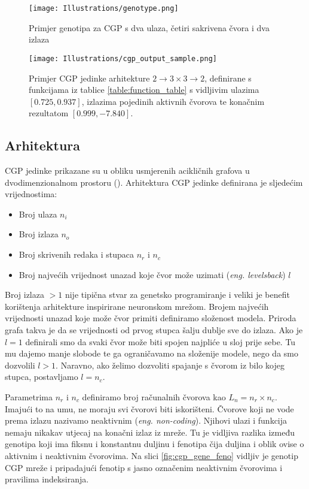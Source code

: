 \begin{figure}
	\centering
	\texttt{[image: Illustrations/genotype.png]}
	\caption{Primjer genotipa za CGP s dva ulaza, četiri sakrivena čvora i dva izlaza}
	\label{fig:genotype}
\end{figure}

\begin{figure}
	\centering
	\texttt{[image: Illustrations/cgp\_output\_sample.png]}
	\caption{Primjer CGP jedinke arhitekture $2 \rightarrow 3 \times 3 \rightarrow 2$, definirane s funkcijama iz tablice \ref{table:function_table} s vidljivim ulazima $[0.725, 0.937]$, izlazima pojedinih aktivnih čvorova te konačnim rezultatom $[0.999, -7.840]$.}
	\label{fig:cgp_output_sample}
\end{figure}

\subsection{Arhitektura}
CGP jedinke prikazane su u obliku usmjerenih acikličnih grafova u dvodimenzionalnom prostoru (\cite{cgp}).
Arhitektura CGP jedinke definirana je sljedećim vrijednostima:
\begin{itemize}
	\item Broj ulaza $n_i$
	\item Broj izlaza $n_o$
	\item Broj skrivenih redaka i stupaca $n_r$ i $n_c$
	\item Broj najvećih vrijednost unazad koje čvor može uzimati (\emph{eng. levelsback}) $l$
\end{itemize}
Broj izlaza $>1$ nije tipična stvar za genetsko programiranje i veliki je benefit korištenja arhitekture inspirirane neuronskom mrežom.
Brojem najvećih vrijednosti unazad koje može čvor primiti definiramo složenost modela.
Priroda grafa takva je da se vrijednosti od prvog stupca šalju dublje sve do izlaza.
Ako je $l = 1$ definirali smo da svaki čvor može biti spojen najpliće u sloj prije sebe.
Tu mu dajemo manje slobode te ga ograničavamo na složenije modele, nego da smo dozvolili $l > 1$.
Naravno, ako želimo dozvoliti spajanje s čvorom iz bilo kojeg stupca, postavljamo  $l=n_c$.

Parametrima $n_r$ i $n_c$ definiramo broj računalnih čvorova kao $L_n = n_r \times n_c$.
Imajući to na umu, ne moraju svi čvorovi biti iskorišteni.
Čvorove koji ne vode prema izlazu nazivamo neaktivnim (\emph{eng. non-coding}).
Njihovi ulazi i funkcija nemaju nikakav utjecaj na konačni izlaz iz mreže.
Tu je vidljiva razlika između genotipa koji ima fiksnu i konstantnu duljinu i fenotipa čija duljina i oblik ovise o aktivnim i neaktivnim čvorovima.
Na slici \ref{fig:cgp_gene_feno} vidljiv je genotip CGP mreže i pripadajući fenotip s jasno označenim neaktivnim čvorovima i pravilima indeksiranja.

